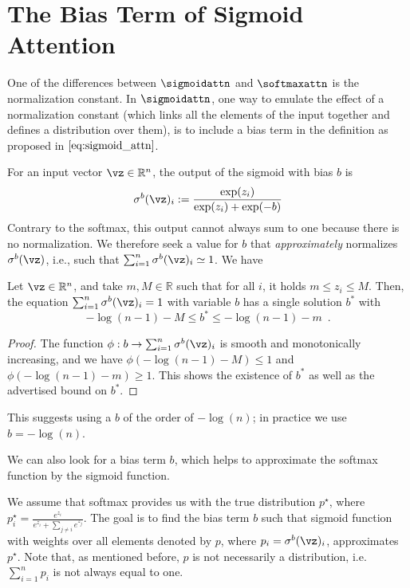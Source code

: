 \section{The Bias Term of Sigmoid Attention}
\label{app:sigmoid_bias}

One of the differences between $\sigmoidattn$ and $\softmaxattn$ is the normalization constant. In $\sigmoidattn$, one way to emulate the effect of a normalization constant (which links all the elements of the input together and defines a distribution over them), is to include a bias term in the definition as proposed in $\cref{eq:sigmoid_attn}$.


For an input vector $\vz\in\mathbb{R}^n$, the output of the sigmoid with bias $b$ is $$
\sigma^b(\vz)_i := \frac{\exp(z_i)}{\exp(z_i) + \exp(-b)}
$$
Contrary to the softmax, this output cannot always sum to one because there is no normalization.
We therefore seek a value for $b$ that \emph{approximately} normalizes $\sigma^b(\vz)$, i.e., such that $\sum_{i=1}^n \sigma^b(\vz)_i \simeq 1$.
We have
\begin{proposition}
    Let $\vz \in\mathbb{R}^n$, and take $m, M \in\mathbb{R}$ such that for all $i$, it holds $m\leq z_i\leq M$. Then, the equation $\sum_{i=1}^n \sigma^b(\vz)_i = 1$ with variable $b$ has a single solution $b^*$ with
    $$-\log(n-1) - M\leq b^*\leq -\log(n - 1) - m\enspace.$$
\end{proposition}
\begin{proof}
    The function $\phi: b\to \sum_{i=1}^n \sigma^b(\vz)_i$ is smooth and monotonically increasing, and we have $\phi(-\log(n-1)  - M) \leq 1$ and $\phi(-\log(n-1) - m)\geq1$. This shows the existence of $b^*$ as well as the advertised bound on $b^*$. 
\end{proof}
This suggests using a $b$ of the order of $-\log(n)$; in practice we use $b=-\log(n)$.


We can also look for a bias term $b$, which helps to approximate the softmax function by the sigmoid function.




We assume that softmax provides us with the true distribution $p^\star$, where $p_i^\star = \frac{e^{z_i}}{e^{z_i} + \sum_{j \neq i} e^{z_j}}$. The goal is to find the bias term $b$ such that sigmoid function with weights over all elements denoted by $p$, where $p_i = \sigma^b(\vz)_i$, approximates $p^\star$. Note that, as mentioned before, $p$ is not necessarily a distribution, i.e.\ $\sum_{i = 1}^n p_i$ is not always equal to one.


